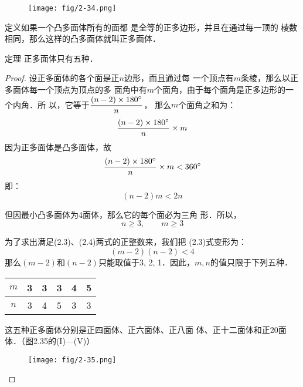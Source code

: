 \begin{figure}[htp]
    \centering
\texttt{[image: fig/2-34.png]}
    \caption{}
\end{figure}

\begin{blk}
    {定义}如果一个凸多面体所有的面都
是全等的正多边形，并且在通过每一顶的
棱数相同，那么这样的凸多面体就叫正多面体．
\end{blk}

\begin{blk}
    {定理} 正多面体只有五种．
\end{blk}

\begin{proof}
    设正多面体的各个面是正$n$边形，而且通过每
    一个顶点有$m$条棱，那么以正多面体每一个顶点为顶点的多
    面角中有$m$个面角，由于每个面角是正多边形的一个内角．所
    以，它等于$\dfrac{(n-2)\times 180^{\circ}}{n}$，
    那么$m$个面角之和为：
\[\dfrac{(n-2)\times 180^{\circ}}{n}\times m\]
因为正多面体是凸多面体，故
\[\dfrac{(n-2)\times 180^{\circ}}{n}\times m<360^{\circ}\]
即：
\begin{equation}
    (n-2)m<2n
\end{equation}

但因最小凸多面体为4面体，那么它的每个面必为三角
形．所以，
\begin{equation}
    n\ge 3,\qquad m\ge 3
\end{equation}

为了求出满足(2.3)、(2.4)两式的正整数来，我们把
(2.3)式变形为：
\[(m-2)(n-2)<4\]
那么$(m-2)$和$(n-2)$只能取值于3, 2, 1．因此，$m,n$的值只限于下列五种．
\begin{center}
\begin{tabular}{c|ccccc}
    \hline
   $ m$&3&3&3&4&5\\
   \hline
$n$&3&4&5&3&3\\
\hline
\end{tabular}
\end{center}
这五种正多面体分别是正四面体、正六面体、正八面
体、正十二面体和正20面体．（图2.35的(I)—(V)）
\begin{figure}[htp]
    \centering
\texttt{[image: fig/2-35.png]}
    \caption{}
\end{figure}
\end{proof}

